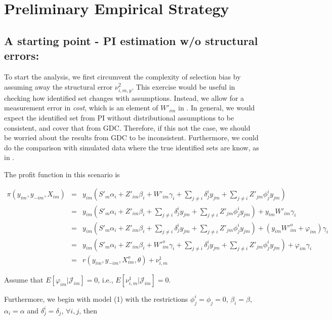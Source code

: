 \documentclass[draft]{article}
\begin{document}
\section{Preliminary Empirical Strategy}\label{es}

\subsection{A starting point - PI estimation w/o structural errors:}

To start the analysis, we first circumvent the complexity of selection bias by assuming away the structural error $\nu_{i,m,y}^2$. This exercise would be useful in checking how identified set changes with assumptions. Instead, we allow for a measurement error in \textit{cost}, which is an element of $W'_{im}$ in \cite{ciliberto2009market}. In general, we would expect the identified set from PI without distributional assumptions to be consistent, and cover that from GDC. Therefore, if this not the case, we should be worried about the results from GDC to be inconsistent. Furthermore, we could do the comparison with simulated data where the true identified sets are know, as in \cite{pakes2015moment}.


The profit function in this scenario is

\begin{eqnarray}
\pi(y_{im},y_{-im},X_{im}) &=& y_{im}(S'_m\alpha_i+Z'_{im}\beta_i+W'_{im} \gamma_i+\sum_{j\neq i}\delta_{j}^i y_{jm}+\sum_{j\neq i}Z'_{jm}\phi_j^iy_{jm})  \nonumber \\
&=& y_{im}(S'_m\alpha_i+Z'_{im}\beta_i +\sum_{j\neq i}\delta_{j}^i y_{jm}+\sum_{j\neq i}Z'_{jm}\phi_j^iy_{jm}) + y_{im} W'_{im} \gamma_i \nonumber \\
&=& y_{im}(S'_m\alpha_i+Z'_{im}\beta_i +\sum_{j\neq i}\delta_{j}^i y_{jm}+\sum_{j\neq i}Z'_{jm}\phi_j^iy_{jm}) + (y_{im} W'^o_{im}  + \varphi_{im})\gamma_i\nonumber \\
&=& y_{im}(S'_m\alpha_i+Z'_{im}\beta_i+ W'^o_{im}\gamma_i+\sum_{j\neq i}\delta_{j}^i y_{jm}+\sum_{j\neq i}Z'_{jm}\phi_j^iy_{jm}) + \varphi_{im}\gamma_{i}\nonumber \\
&=& r(y_{im},y_{-im},X^o_{im}, \theta) + \nu^1_{i,m} 
\label{profit_PI}
\end{eqnarray}


Assume that $E[\varphi_{im}|\mathcal{J}_{im}] = 0$, i.e., $E[\nu^1_{i,m}|\mathcal{J}_{im}] = 0$.

Furthermore, we begin with model (1) with the restrictions $\phi^i_j = \phi_j = 0$, $\beta_i=\beta$, $\alpha_i = \alpha$ and $\delta^i_j = \delta_j$, $\forall i, j$, then
\end{document}
